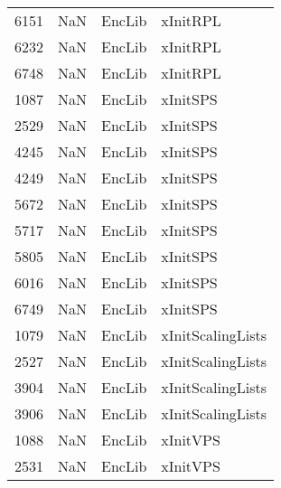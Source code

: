 \begin{tabular}{llll}
6151 &                   NaN &                     EncLib &                                  xInitRPL \\
6232 &                   NaN &                     EncLib &                                  xInitRPL \\
6748 &                   NaN &                     EncLib &                                  xInitRPL \\
1087 &                   NaN &                     EncLib &                                  xInitSPS \\
2529 &                   NaN &                     EncLib &                                  xInitSPS \\
4245 &                   NaN &                     EncLib &                                  xInitSPS \\
4249 &                   NaN &                     EncLib &                                  xInitSPS \\
5672 &                   NaN &                     EncLib &                                  xInitSPS \\
5717 &                   NaN &                     EncLib &                                  xInitSPS \\
5805 &                   NaN &                     EncLib &                                  xInitSPS \\
6016 &                   NaN &                     EncLib &                                  xInitSPS \\
6749 &                   NaN &                     EncLib &                                  xInitSPS \\
1079 &                   NaN &                     EncLib &                         xInitScalingLists \\
2527 &                   NaN &                     EncLib &                         xInitScalingLists \\
3904 &                   NaN &                     EncLib &                         xInitScalingLists \\
3906 &                   NaN &                     EncLib &                         xInitScalingLists \\
1088 &                   NaN &                     EncLib &                                  xInitVPS \\
2531 &                   NaN &                     EncLib &                                  xInitVPS \\

\end{tabular}
